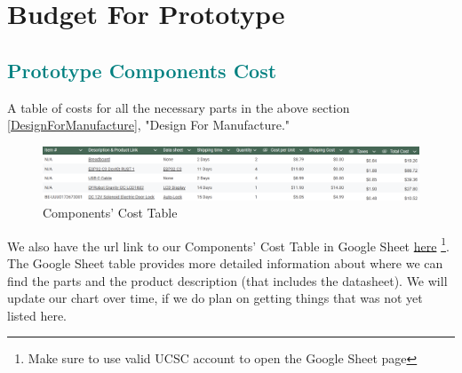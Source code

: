 \section{Budget For Prototype}

\textcolor{teal}{\subsection{Prototype Components Cost}}

A table of costs for all the necessary parts in the above section \ref{DesignForManufacture}, "Design For Manufacture."

\begin{figure}[!htbp]
    \centering
    \includegraphics[width=1\linewidth]{./img/Budget_Table.png}
    \caption{Components' Cost Table}
    \label{fig:ComponentsCostFig}
\end{figure}

We also have the url link to our Components' Cost Table in Google Sheet \href{https://docs.google.com/spreadsheets/d/1MM1I6pMeTvkLUvmaVntZBH55sUJj1Fe8FqNDRRbwthA/edit?usp=sharing}{here} \footnote{Make sure to use valid UCSC account to open the Google Sheet page}. The Google Sheet table provides more detailed information about where we can find the parts and the product description (that includes the datasheet). We will update our chart over time, if we do plan on getting things that was not yet listed here.
